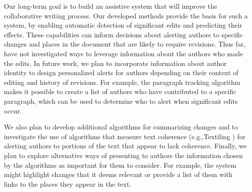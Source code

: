Our long-term goal is to build an assistive system that will improve the
collaborative writing process. Our developed methods provide the basis
for such a system, by enabling automatic detection of significant edits
and predicting their effects. These capabilities can inform decisions
about alerting authors to specific changes and places in the document
that are likely to require revisions. Thus far, have not investigated
ways to leverage information about the authors who made the edits. In
future work, we plan to incorporate information about author identity to
design personalized alerts for authors depending on their context of
editing and history of revisions. For example, the paragraph tracking
algorithm makes it possible to create a list of authors who have
contributed to a specific paragraph, which can be used to determine who
to alert when significant edits occur.

We also plan to develop additional algorithms for summarizing changes
and to investigate the use of algorithms that measure text coherence
(e.g.,Textiling \cite{hearst1994multi}) for alerting authors to portions
of the text that appear to lack coherence. Finally, we plan to explore
alternative ways of presenting to authors the information chosen by the
algorithms as important for them to consider. For example, the system
might highlight changes that it deems relevant or provide a list of them
with links to the places they appear in the text.
